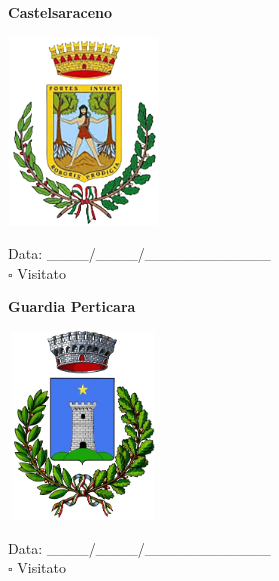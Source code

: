 \documentclass[a5paper,12pt]{article}
\begin{document}
\vspace{0.7cm}

\noindent
\begin{minipage}[t]{0.45\textwidth}
    \begin{center}
        \textbf{Castelsaraceno}
    \end{center}
    \vspace{-0.5cm} %
    \begin{center}
        \includegraphics[height= 5cm, width=4cm]{Basilicata/Castelsaraceno-Stemma.png}
    \end{center}
    \vspace{-0.4cm} %
    \begin{flushleft}
        Data: \_\_\_\_/\_\_\_\_/\_\_\_\_\_\_\_\_\_\_\_\_ \\
        $\square$ Visitato
    \end{flushleft}
\end{minipage}
\hfill
\noindent
\begin{minipage}[t]{0.45\textwidth}
    \begin{center}
        \textbf{Guardia Perticara}
    \end{center}
    \vspace{-0.5cm} %
    \begin{center}
        \includegraphics[height= 5cm, width=4cm]{Basilicata/Guardia_Perticara-Stemma.png}
    \end{center}
    \vspace{-0.4cm} %
    \begin{flushleft}
        Data: \_\_\_\_/\_\_\_\_/\_\_\_\_\_\_\_\_\_\_\_\_ \\
        $\square$ Visitato
    \end{flushleft}
\end{minipage}
\end{document}
